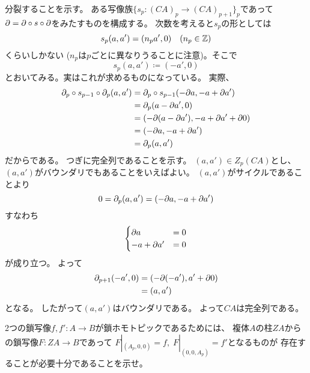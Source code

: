 \documentclass[report]{jlreq}
\begin{document}
\begin{answer}[解法 2.]
    分裂することを示す。
    ある写像族$\{ s_p \colon (CA)_p \to (CA)_{p + 1} \}_p$であって
    $\partial = \partial \circ s \circ \partial$をみたすものを構成する。
    次数を考えると$s_p$の形としては
    \begin{equation}
        s_p(a, a') = (n_p a', 0) \quad (n_p \in \mathbb{Z})
    \end{equation}
    くらいしかない ($n_p$は$p$ごとに異なりうることに注意)。そこで
    \begin{equation}
        s_p(a, a') \coloneqq (-a', 0)
    \end{equation}
    とおいてみる。実はこれが求めるものになっている。
    実際、
    \begin{alignat}{1}
        \partial_p \circ s_{p - 1} \circ \partial_p (a, a')
            &= \partial_p \circ s_{p - 1} (-\partial a, -a + \partial a') \\
            &= \partial_p (a - \partial a', 0) \\
            &= (-\partial(a - \partial a'), -a + \partial a' + \partial 0) \\
            &= (-\partial a, -a + \partial a') \\
            &= \partial_p (a, a')
    \end{alignat}
    だからである。
    つぎに完全列であることを示す。
    $(a, a') \in Z_p(CA)$とし、
    $(a, a')$がバウンダリでもあることをいえばよい。
    $(a, a')$がサイクルであることより
    \begin{equation}
        0 = \partial_p (a, a') = (-\partial a, -a + \partial a')
    \end{equation}
    すなわち
    \begin{equation}
        \begin{cases}
            \partial a &= 0 \\
            -a + \partial a' &= 0
        \end{cases}
    \end{equation}
    が成り立つ。
    よって
    \begin{alignat}{1}
        \partial_{p + 1} (-a', 0)
            &= (-\partial (- a'), a' + \partial 0) \\
            &= (a, a')
    \end{alignat}
    となる。
    したがって$(a, a')$はバウンダリである。
    よって$CA$は完全列である。
\end{answer}

\begin{problem}
    2つの鎖写像$f, f' \colon A \to B$が鎖ホモトピックであるためには、
    複体$A$の柱$ZA$からの鎖写像$F \colon ZA \to B$であって
    $F|_{(A_p, 0, 0)} = f, \; F|_{(0, 0, A_p)} = f'$となるものが
    存在することが必要十分であることを示せ。
\end{problem}
\end{document}

